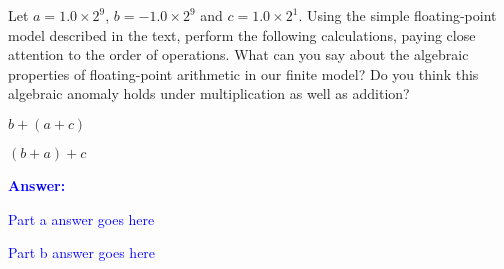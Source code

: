 \item{}
Let $a=1.0\times2^9$, $b=-1.0\times2^9$ and $c=1.0\times2^1$. Using the simple
floating-point model described in the text, perform the following calculations,
paying close attention to the order of operations. What can you say about the
algebraic properties of floating-point arithmetic in our finite model? Do you
think this algebraic anomaly holds under multiplication as well as addition?
\begin{list}{\textbf{}}{}
    \item $b+(a+c)$\\
    \item $(b+a)+c$\\
\end{list}
\vskip12pt
\ifanswers
\textcolor{blue}{
\textbf{Answer:}\\
\begin{list}{\textbf{}}{}
    \item Part a answer goes here
    \item Part b answer goes here
\end{list}
}
\newpage
\fi
